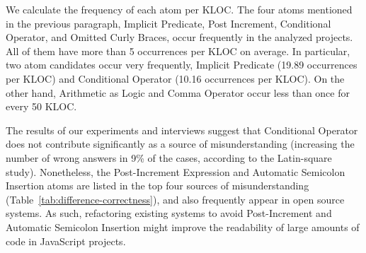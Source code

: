 We calculate the frequency of each atom per KLOC.
The four atoms mentioned in the previous paragraph,
Implicit Predicate, Post Increment, Conditional Operator, and Omitted Curly Braces, occur frequently in the analyzed projects. All of them have more than 5 occurrences per KLOC on average. In particular, two atom candidates occur very frequently, Implicit Predicate (19.89 occurrences per KLOC) and Conditional Operator (10.16 occurrences per KLOC). On the other hand, Arithmetic as Logic and Comma Operator occur less than once for every 50 KLOC. 


The results of our experiments and interviews suggest that Conditional Operator does not contribute significantly as a source of misunderstanding (increasing the number of wrong answers in 9\% of the cases, according to the Latin-square study). Nonetheless, the Post-Increment Expression and Automatic Semicolon Insertion atoms are listed in the top four sources of misunderstanding  (Table~\ref{tab:difference-correctness}), and also frequently appear in open source systems. As such, refactoring existing systems to avoid Post-Increment and Automatic Semicolon Insertion might improve the readability of large amounts of code in JavaScript projects. 


